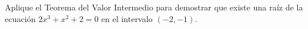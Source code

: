 \setcounter{enumi}{32}
\item Aplique el Teorema del Valor Intermedio para demostrar que existe una raíz de la ecuación $2x^3 + x^2 + 2 = 0$ en el intervalo $(-2, -1)$.
